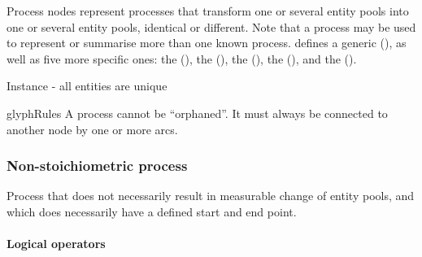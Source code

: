 Process nodes represent processes that transform one or several entity
pools into one or several entity pools, identical or different. Note
that a process may be used to represent or summarise more than one
known process.  \SBGNPDLone defines a generic 
(), as well as five more specific ones: the
 (), the  (), the 
(), the  (),
and the  ().

\begin{glyphDescription}
  \begin{glyphIdentity}
    \item Instance - all entities are unique
  \end{glyphIdentity}

  \item glyphRules A process cannot be ``orphaned''. It must always
    be connected to another node by one or more arcs.
\end{glyphDescription}


\subsubsection{Non-stoichiometric process}

 Process that does not necessarily result in measurable change of entity pools, and which does necessarily have a defined start and end point. 






\paragraph{Logical operators}\label{sec:logic}

